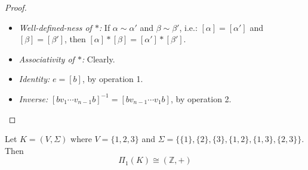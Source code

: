\begin{proof}
    \begin{itemize}
        \item \textit{Well-defined-ness of $*$:} If $\alpha \sim \alpha'$ and $\beta \sim \beta'$, i.e.: $[\alpha] = [\alpha']$ and $[\beta] = [\beta']$, then $[\alpha] * [\beta] = [\alpha'] * [\beta']$.
        \item \textit{Associativity of $*$:} Clearly.
        \item \textit{Identity:} $e = [b]$, by operation 1.
        \item \textit{Inverse:} $[b v_1 \cdots v_{n-1} b]^{-1} = [bv_{n-1} \cdots v_1b]$, by operation 2.
    \end{itemize}
\end{proof}

\begin{proposition}
    Let $K = (V, \Sigma)$ where $V = \{1,2,3\}$ and $\Sigma =\{ \{1\},\{2 \},\{3\} ,\{1,2\}, \{1,3\}, \{2,3\} \}$. Then
    $$\Pi_1 (K) \cong (\mathbb{Z},+)$$
\end{proposition}

